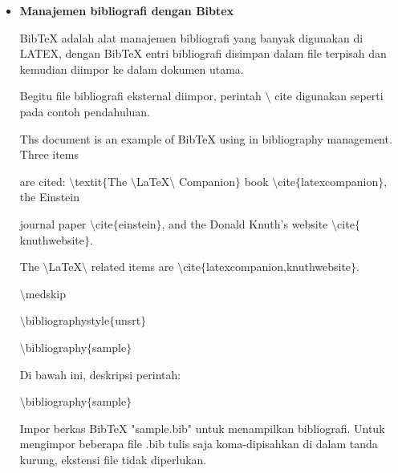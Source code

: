 \begin{itemize}
	\item {\fontsize{14pt}{14pt}\selectfont \textbf{Manajemen bibliografi dengan Bibtex}}\par
\vspace{\baselineskip}
BibTeX adalah alat manajemen bibliografi yang banyak digunakan di LATEX, dengan BibTeX entri bibliografi disimpan dalam file terpisah dan kemudian diimpor ke dalam dokumen utama.\par
\vspace{\baselineskip}
Begitu file bibliografi eksternal diimpor, perintah $\setminus$ cite digunakan seperti pada contoh pendahuluan.\par

\hspace*{0.5in}Ths document is an example of BibTeX using in bibliography management. Three items \par

are cited: $\setminus$textit$ \{ $The $\setminus$LaTeX$\setminus$ Companion$ \} $ book $\setminus$cite$ \{ $latexcompanion$ \} $, the Einstein\par

journal paper $\setminus$cite$ \{ $einstein$ \} $, and the Donald Knuth's website $\setminus$cite$ \{ $knuthwebsite$ \} $. \par
\vspace{\baselineskip}
The $\setminus$LaTeX$\setminus$ related items are $\setminus$cite$ \{ $latexcompanion,knuthwebsite$ \} $. \par

\hspace*{0.5in}$\setminus$medskip \par

\hspace*{0.5in}$\setminus$bibliographystyle$ \{ $unsrt$ \} $\par

\hspace*{0.5in}$\setminus$bibliography$ \{ $sample$ \} $\par

\vspace{\baselineskip}
Di bawah ini, deskripsi perintah:\par

$\setminus$bibliography$ \{ $sample$ \} $\par

\hspace*{0.5in}Impor berkas BibTeX "sample.bib" untuk menampilkan bibliografi. Untuk mengimpor beberapa file .bib tulis saja koma-dipisahkan di dalam tanda kurung, ekstensi file tidak diperlukan.\par


\end{itemize}
